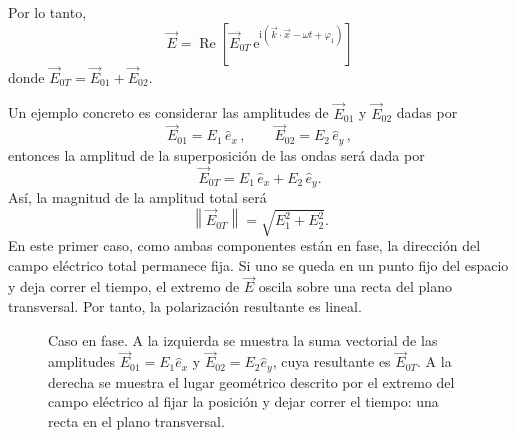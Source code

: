 \documentclass[12pt,a4paper]{article}
\theoremstyle{definition}
\theoremstyle{plain}
\numberwithin{equation}{section}
\theoremstyle{remark}
\newcommand{\ii}{\mathrm{i}}
\newcommand{\ee}{\mathrm{e}}
\begin{document}
Por lo tanto,
\begin{equation*}
    \vec E=  \operatorname{Re}\left[\vec E_{0T}\,\ee^{\ii\left(\vec k\cdot\vec x-\omega t+\varphi_1\right)}\right]
\end{equation*}
donde $\vec E_{0T}=\vec E_{01}+\vec E_{02}$.

Un ejemplo concreto es considerar las amplitudes de $\vec E_{01}$ y $\vec E_{02}$ dadas por
\begin{equation*}
    \vec E_{01}= E_1\,\hat e_x \, , \qquad \vec E_{02}= E_2\, \hat e_y \, ,
\end{equation*}
entonces la amplitud de la superposición de las ondas será dada por
\begin{equation*}
    \vec E_{0T}= E_1\,\hat e_x + E_2\, \hat e_y.
\end{equation*}
Así, la magnitud de la amplitud total será
\begin{equation*}
    \left\|\vec E_{0T}\right\|=\sqrt{E_1^2+E_2^2}.
\end{equation*}
En este primer caso, como ambas componentes están en fase, la dirección del campo eléctrico total permanece fija. Si uno se queda en un punto fijo del espacio y deja correr el tiempo, el extremo de $\vec E$ oscila sobre una recta del plano transversal. Por tanto, la polarización resultante es lineal.

\begin{figure}[ht]
    \centering
    \begingroup
    \shorthandoff{<>}
    \endgroup
    \caption{Caso en fase. A la izquierda se muestra la suma vectorial de las amplitudes $\vec E_{01}=E_1\hat e_x$ y $\vec E_{02}=E_2\hat e_y$, cuya resultante es $\vec E_{0T}$. A la derecha se muestra el lugar geométrico descrito por el extremo del campo eléctrico al fijar la posición y dejar correr el tiempo: una recta en el plano transversal.}
\end{figure}
\end{document}
